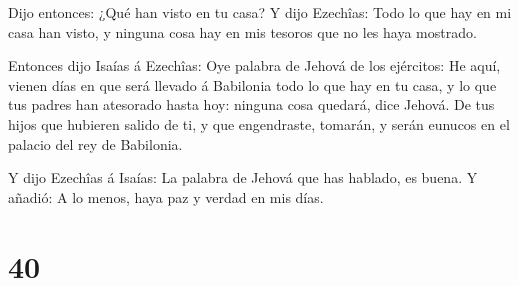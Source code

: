  Dijo entonces: ¿Qué han visto en tu casa? Y dijo Ezechîas:
Todo lo que hay en mi casa han visto, y ninguna cosa hay en mis tesoros
que no les haya mostrado.

 Entonces dijo Isaías á Ezechîas: Oye palabra de Jehová de
los ejércitos:  He aquí, vienen días en que será llevado á
Babilonia todo lo que hay en tu casa, y lo que tus padres han atesorado
hasta hoy: ninguna cosa quedará, dice Jehová.  De tus hijos
que hubieren salido de ti, y que engendraste, tomarán, y serán eunucos
en el palacio del rey de Babilonia.

 Y dijo Ezechîas á Isaías: La palabra de Jehová que has
hablado, es buena. Y añadió: A lo menos, haya paz y verdad en mis días.

\hypertarget{section-39}{%
\section{40}\label{section-39}}

